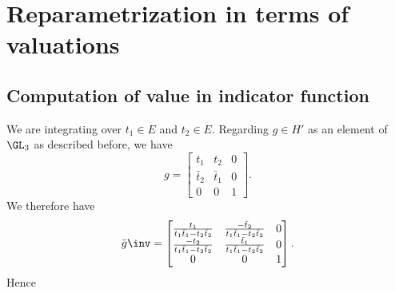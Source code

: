 \section{Reparametrization in terms of valuations}
\subsection{Computation of value in indicator function}
We are integrating over $t_1 \in E$ and $t_2 \in E$.
Regarding $g \in H'$ as an element of $\GL_3$ as described before, we have
\[ g = \begin{bmatrix}
  t_1 & t_2 & 0  \\
  \bar t_2 & \bar t_1 & 0 \\
  0 & 0 & 1
  \end{bmatrix}. \]
We therefore have
\[ \bar g \inv = \begin{bmatrix}
  \frac{t_1}{t_1 \bar t_1 - t_2 \bar t_2} & \frac{-\bar t_2}{t_1 \bar t_1 - t_2 \bar t_2} & 0 \\
  \frac{-t_2}{t_1 \bar t_1 - t_2 \bar t_2} & \frac{\bar t_1}{t_1 \bar t_1 - t_2 \bar t_2} & 0 \\
  0 & 0 & 1 \end{bmatrix}. \]
Hence
